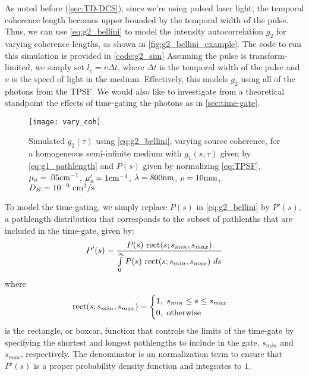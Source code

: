 As noted before (\autoref{sec:TD-DCS}), since we're using pulsed laser light, the temporal coherence length becomes upper bounded by the temporal width of the pulse. Thus, we can use \autoref{eq:g2_bellini} to model the intensity autocorrelation $g_2$ for varying coherence lengths, as shown in \autoref{fig:g2_bellini_example}. The code to run this simulation is provided in \autoref{code:g2_sim} Assuming the pulse is transform-limited, we simply set $l_c = v\Delta t$, where $\Delta t$ is the temporal width of the pulse and $v$ is the speed of light in the medium. Effectively, this models $g_2$ using all of the photons from the TPSF. We would also like to investigate from a theoretical standpoint the effects of time-gating the photons as in \autoref{sec:time-gate}.

\begin{figure}[tb]
    \centering
    \texttt{[image: vary\_coh]} 
    \caption{Simulated $g_2(\tau)$ using \autoref{eq:g2_bellini}, varying source coherence, for a homogeneous semi-infinite medium with $g_1(s,\tau)$ given by \autoref{eq:g1_pathlength} and $P(s)$ given by normalizing \autoref{eq:TPSF}, $\mu_a=.05 \textnormal{cm}^{-1}$, $\mu_s'=1 \textnormal{cm}^{-1}$, $\lambda=800\textnormal{nm}$, $\rho=10 \textnormal{mm}$, $D_B=10^{-9} \textnormal{ cm}^2/\textnormal{s}$}
    \label{fig:g2_bellini_example}
\end{figure}

To model the time-gating, we simply replace $P(s)$ in \autoref{eq:g2_bellini} by $P'(s)$, a pathlength distribution that corresponds to the subset of pathlenths that are included in the time-gate, given by:
\begin{equation} \label{eq:modified_bellini_pdf}
P'(s) = \frac{P(s)~\textnormal{rect}(s; s_{min}, s_{max})}{\int\limits_{0}^{\infty} P(s)~\textnormal{rect}(s; s_{min}, s_{max}) ~ds}   
\end{equation}
where
\begin{equation}
\textnormal{rect}(s; s_{min}, s_{max}) = 
\begin{cases}
1,~s_{min} \leq s \leq s_{max} \\
0,~\textnormal{otherwise} \\
\end{cases}
\end{equation} 
is the rectangle, or boxcar, function that controls the limits of the time-gate by specifying the shortest and longest pathlengths to include in the gate, $s_{min}$ and $s_{max}$, respectively. The denominator is an normalization term to ensure that $P'(s)$ is a proper probability density function and integrates to $1$. 

